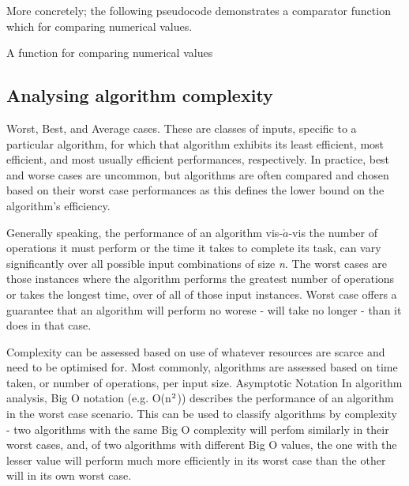 \documentclass[12pt, a4paper]{article}
\begin{document}
More concretely; the following pseudocode demonstrates a comparator function which for comparing numerical values.

\begin{algorithm}
\caption{A function for comparing numerical values}\label{euclid}
\begin{algorithmic}[1]
 
\EndIf
{} 
\EndIf
{} 
\EndIf
\EndProcedure
\end{algorithmic}
\end{algorithm}






\subsection{Analysing algorithm complexity}

Worst, Best, and Average cases.
These are classes of inputs, specific to a particular algorithm, for which that algorithm exhibits its least efficient, most efficient, and most usually efficient performances, respectively. In practice, best and worse cases are uncommon, but algorithms are often compared and chosen based on their worst case performances as this defines the lower bound on the algorithm's efficiency.

Generally speaking, the performance of an algorithm vis-$\acute{a}$-vis the number of operations it must perform or the time it takes to complete its task, can vary significantly over all possible input combinations of size \emph{n}. The worst cases are those instances where the algorithm performs the greatest number of operations or takes the longest time, over of all of those input instances. Worst case offers a guarantee that an algorithm will perform no worese - will take no longer - than it does in that case. 


Complexity can be assessed based on use of whatever resources are scarce and need to be optimised for. Most commonly, algorithms are assessed based on time taken, or number of operations, per input size. 
Asymptotic Notation
In algorithm analysis, Big O notation (e.g. O(n$\textsuperscript{2}$)) describes the performance of an algorithm in the worst case scenario. This can be used to classify algorithms by complexity - two algorithms with the same Big O complexity will perfom similarly in their worst cases, and, of two algorithms with different Big O values, the one with the lesser value will perform much more efficiently in its worst case than the other will in its own worst case.
\end{document}
